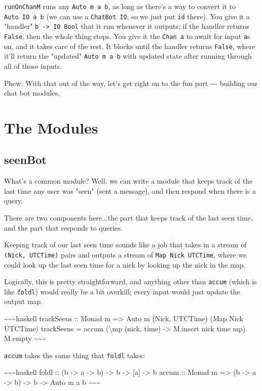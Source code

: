 \documentclass[]{article}
\begin{document}
\texttt{runOnChanM} runs any \texttt{Auto\ m\ a\ b}, as long as there's a way to
convert it to \texttt{Auto\ IO\ a\ b} (we can use a \texttt{ChatBot\ IO}, so we
just put \texttt{id} there). You give it a "handler"
\texttt{b\ -\textgreater{}\ IO\ Bool} that it run whenever it outputs; if the
handler returns \texttt{False}, then the whole thing stops. You give it the
\texttt{Chan\ a} to await for input \texttt{a}s on, and it takes care of the
rest. It blocks until the handler returns \texttt{False}, where it'll return the
"updated" \texttt{Auto\ m\ a\ b} with updated state after running through all of
those inputs.

Phew. With that out of the way, let's get right on to the fun part -\/-\/-
building our chat bot modules.

\section{The Modules}

\subsection{seenBot}

What's a common module? Well, we can write a module that keeps track of the last
time any user was "seen" (sent a message), and then respond when there is a
query.

There are two components here...the part that keeps track of the last seen time,
and the part that responds to queries.

Keeping track of our last seen time sounds like a job that takes in a stream of
\texttt{(Nick,\ UTCTime)} pairs and outputs a stream of
\texttt{Map\ Nick\ UTCTime}, where we could look up the last seen time for a
nick by looking up the nick in the map.

Logically, this is pretty straightforward, and anything other than
\texttt{accum} (which is like \texttt{foldl\textquotesingle{}}) would really be
a bit overkill; every input would just update the output map.

\textasciitilde{}\textasciitilde{}\textasciitilde{}haskell trackSeens :: Monad m
=\textgreater{} Auto m (Nick, UTCTime) (Map Nick UTCTime) trackSeens = accum
(\textbackslash{}mp (nick, time) -\textgreater{} M.insert nick time mp) M.empty
\textasciitilde{}\textasciitilde{}\textasciitilde{}

\texttt{accum} takes the same thing that \texttt{foldl} takes:

\textasciitilde{}\textasciitilde{}\textasciitilde{}haskell foldl :: (b
-\textgreater{} a -\textgreater{} b) -\textgreater{} b -\textgreater{} {[}a{]}
-\textgreater{} b accum :: Monad m =\textgreater{} (b -\textgreater{} a
-\textgreater{} b) -\textgreater{} b -\textgreater{} Auto m a b
\textasciitilde{}\textasciitilde{}\textasciitilde{}
\end{document}
